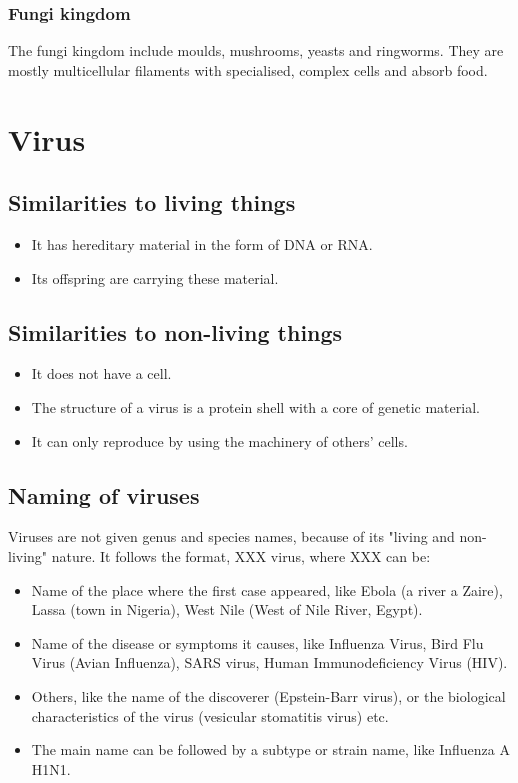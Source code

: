 \documentclass[11pt]{article}
\begin{document}
\subsubsection{Fungi kingdom}
\label{sec:org2c46eb0}
The fungi kingdom include moulds, mushrooms, yeasts and ringworms. They are mostly multicellular filaments with specialised, complex cells and absorb food.
\section{Virus}
\label{sec:org7aae13e}

\subsection{Similarities to living things}
\label{sec:org49974c8}
\begin{itemize}
\item It has hereditary material in the form of DNA or RNA.
\item Its offspring are carrying these material.
\end{itemize}
\subsection{Similarities to non-living things}
\label{sec:org7c97044}
\begin{itemize}
\item It does not have a cell.
\item The structure of a virus is a protein shell with a core of genetic material.
\item It can only reproduce by using the machinery of others' cells.
\end{itemize}
\subsection{Naming of viruses}
\label{sec:org6078212}
Viruses are not given genus and species names, because of its "living and non-living" nature. It follows the format, XXX virus, where XXX can be:
\begin{itemize}
\item Name of the place where the first case appeared, like Ebola (a river a Zaire), Lassa (town in Nigeria), West Nile (West of Nile River, Egypt).
\item Name of the disease or symptoms it causes, like Influenza Virus, Bird Flu Virus (Avian Influenza), SARS virus, Human Immunodeficiency Virus (HIV).
\item Others, like the name of the discoverer (Epstein-Barr virus), or the biological characteristics of the virus (vesicular stomatitis virus) etc.
\item The main name can be followed by a subtype or strain name, like Influenza A H1N1.
\end{itemize}
\end{document}
